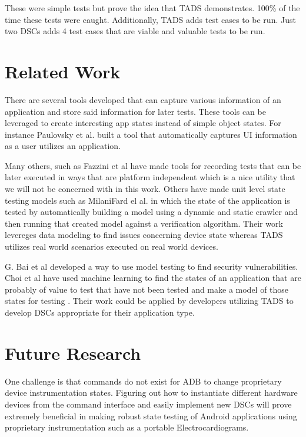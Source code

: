 These were simple tests but prove the idea that TADS demonstrates.  100\% of the time these tests were caught.  Additionally, TADS adds test cases to be run.  Just two DSCs adds 4 test cases that are viable and valuable tests to be run.

\section{Related Work}
There are several tools developed that can capture various information of an application and store said information for later tests.  These tools can be leveraged to create interesting app states instead of simple object states.  For instance Paulovsky et al. \cite{7962332} built a tool that automatically captures UI information as a user utilizes an application. 

Many others, such as Fazzini et al \cite{7927971} have made tools for recording tests that can be later executed in ways that are platform independent which is a nice utility that we will not be concerned with in this work.  Others have made unit level state testing models such as MilaniFard el al. \cite{MilaniFard:2014:LET:2642937.2642991} in which the state of the application is tested by automatically building a model using a dynamic and static crawler and then running that created model against a verification algorithm.  Their work levereges data modeling to find issues concerning device state whereas TADS utilizes real world scenarios executed on real world devices.  

G. Bai et al \cite{7911333} developed a way to use model testing to find security vulnerabilities.  Choi et al have used machine learning to find the states of an application that are probably of value to test that have not been tested and make a model of those states for testing \cite{Choi:2013:GGT:2544173.2509552}.  Their work could be applied by developers utilizing TADS to develop DSCs appropriate for their application type. \\


\section{Future Research}
One challenge is that commands do not exist for ADB to change proprietary device instrumentation states.  Figuring out how to instantiate different hardware devices from the command interface and easily implement new DSCs will prove extremely beneficial in making robust state testing of Android applications using proprietary instrumentation such as a portable Electrocardiograms.  

